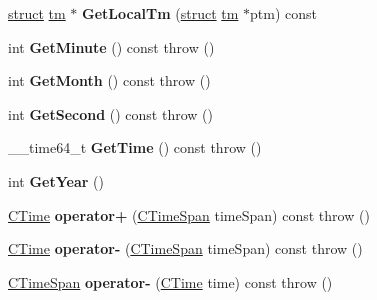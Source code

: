 \begin{DoxyCompactItemize}
\item 
\mbox{\label{class_a_t_l_1_1_c_time_af2bff324496160c2e2fdecb6b7d1cd33}} 
\hyperlink{interfacestruct}{struct} \hyperlink{structtm}{tm} $\ast$ {\bfseries Get\+Local\+Tm} (\hyperlink{interfacestruct}{struct} \hyperlink{structtm}{tm} $\ast$ptm) const
\item 
\mbox{\label{class_a_t_l_1_1_c_time_a07116083d92ff94028d1341f1ad3339c}} 
int {\bfseries Get\+Minute} () const  throw ()
\item 
\mbox{\label{class_a_t_l_1_1_c_time_a79597010dfe441a8b5421ccdc7132638}} 
int {\bfseries Get\+Month} () const  throw ()
\item 
\mbox{\label{class_a_t_l_1_1_c_time_aedb76c0c92894d0b2de3b1dc9d24eb66}} 
int {\bfseries Get\+Second} () const  throw ()
\item 
\mbox{\label{class_a_t_l_1_1_c_time_aaa8aa83803e4693cb9e5a748cf168fa8}} 
\+\_\+\+\_\+time64\+\_\+t {\bfseries Get\+Time} () const  throw ()
\item 
\mbox{\label{class_a_t_l_1_1_c_time_a3feb156f60159e0a0b935981ddbab07b}} 
int {\bfseries Get\+Year} ()
\item 
\mbox{\label{class_a_t_l_1_1_c_time_a0b7c46b1b52b6e65574177e07fc82ab9}} 
\hyperlink{class_a_t_l_1_1_c_time}{C\+Time} {\bfseries operator+} (\hyperlink{class_a_t_l_1_1_c_time_span}{C\+Time\+Span} time\+Span) const  throw ()
\item 
\mbox{\label{class_a_t_l_1_1_c_time_a0fcfac824a5842ab4b15a9d7ae83fd22}} 
\hyperlink{class_a_t_l_1_1_c_time}{C\+Time} {\bfseries operator-\/} (\hyperlink{class_a_t_l_1_1_c_time_span}{C\+Time\+Span} time\+Span) const  throw ()
\item 
\mbox{\label{class_a_t_l_1_1_c_time_a5086ef65a5817678c73c8f75b33f2bb0}} 
\hyperlink{class_a_t_l_1_1_c_time_span}{C\+Time\+Span} {\bfseries operator-\/} (\hyperlink{class_a_t_l_1_1_c_time}{C\+Time} time) const  throw ()
\item 

\end{DoxyCompactItemize}
